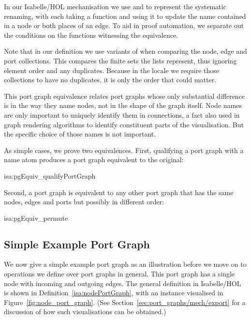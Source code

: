 \documentclass[class=smolathesis,crop=false]{standalone}
\begin{document}
In our Isabelle/HOL mechanisation we use  and  to represent the systematic renaming, with each taking a function and using it to update the name contained in a node or both places of an edge.
To aid in proof automation, we separate out the conditions on the functions witnessing the equivalence.

Note that in our definition we use variants of  when comparing the node, edge and port collections.
This compares the finite sets the lists represent, thus ignoring element order and any duplicates.
Because in the  locale we require those collections to have no duplicates, it is only the order that could matter.

This port graph equivalence relates port graphs whose only substantial difference is in the way they name nodes, not in the shape of the graph itself.
Node names are only important to uniquely identify them in connections, a fact also used in graph rendering algorithms to identify constituent parts of the visualisation.
But the specific choice of those names is not important.

As simple cases, we prove two equivalences.
First, qualifying a port graph with a name atom produces a port graph equivalent to the original:
\begin{isalemma}{isa:pgEquiv_qualifyPortGraph}
  
\end{isalemma}
\noindent
Second, a port graph is equivalent to any other port graph that has the same nodes, edges and ports but possibly in different order:
\begin{isalemma}{isa:pgEquiv_permute}
  
\end{isalemma}

\subsection{Simple Example Port Graph}
\label{sec:port_graphs/mech/simple-ex}

We now give a simple example port graph as an illustration before we move on to operations we define over port graphs in general.
This port graph has a single node with incoming and outgoing edges.
The general definition in Isabelle/HOL is shown in Definition~\ref{isa:nodePortGraph}, with an instance visualised in Figure~\ref{fig:node_port_graph}.
(See Section~\ref{sec:port_graphs/mech/export} for a discussion of how such visualisations can be obtained.)
\end{document}
